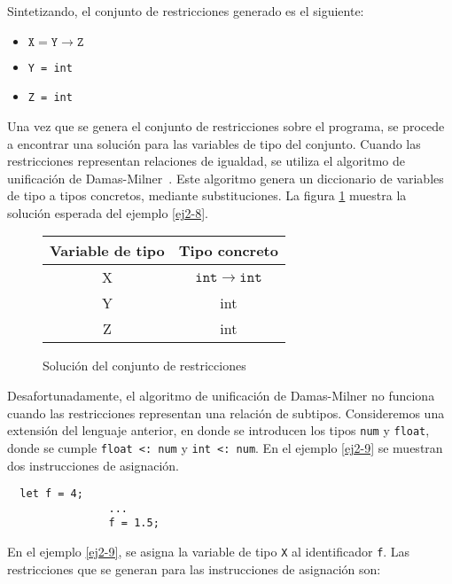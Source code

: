 Sintetizando, el conjunto de restricciones generado es el siguiente:

\begin{itemize}
  \item $\mathtt{X = Y \rightarrow Z}$
  \item \texttt{Y = int}
  \item \texttt{Z = int}
\end{itemize}

Una vez que se genera el conjunto de restricciones sobre el programa, se procede a encontrar una solución para las variables de tipo del conjunto. Cuando las restricciones representan relaciones de igualdad, se utiliza el algoritmo de unificación de Damas-Milner~\cite{damasmilner}. Este algoritmo genera un diccionario de variables de tipo a tipos concretos, mediante substituciones. La figura \ref{tabla2} muestra la solución esperada del ejemplo \ref{ej2-8}.

\begin{figure}[ht]
  \centering
  \ttfamily
  \begin{tabular}{c c}
    Variable de tipo & Tipo concreto \\
    \hline
    X & $\mathtt{int \rightarrow int}$  \\
    Y & int \\
    Z & int \\
  \end{tabular}
  \caption{Solución del conjunto de restricciones}
  \label{tabla2}
\end{figure}

\clearpage
Desafortunadamente, el algoritmo de unificación de Damas-Milner no funciona cuando las restricciones representan una relación de subtipos. Consideremos una extensión del lenguaje anterior,  en donde se introducen los tipos \texttt{num} y \texttt{float}, donde se cumple \texttt{float <: num} y \texttt{int <: num}. En el ejemplo \ref{ej2-9} se muestran dos instrucciones de asignación.
\vspace{0.8em}
\begin{ej}
  \normalfont
  \label{ej2-9}
\begin{lstlisting}
  let f = 4;
                ...
                f = 1.5;
\end{lstlisting}
\end{ej}

En el ejemplo \ref{ej2-9}, se asigna la variable de tipo \texttt{X} al identificador \texttt{f}. Las restricciones que se generan para las instrucciones de asignación son:

